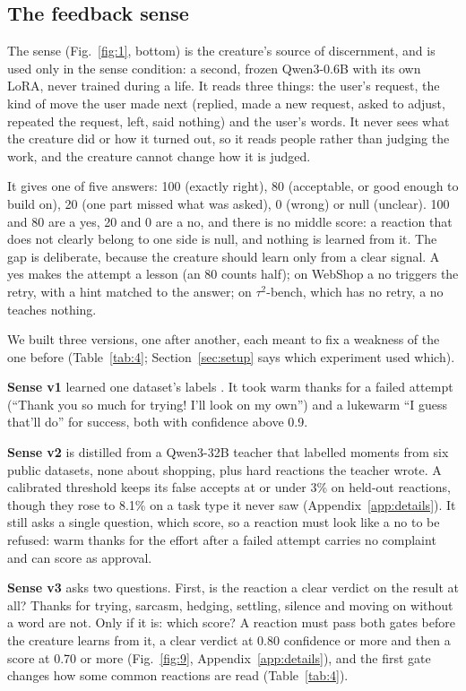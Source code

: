 \subsection{The feedback sense}\label{sec:sense}

The sense (Fig.~\ref{fig:1}, bottom) is the creature's source of discernment, and is used only in the sense condition: a second, frozen Qwen3-0.6B with its own LoRA, never trained during a life. It reads three things: the user's request, the kind of move the user made next (replied, made a new request, asked to adjust, repeated the request, left, said nothing) and the user's words. It never sees what the creature did or how it turned out, so it reads people rather than judging the work, and the creature cannot change how it is judged.

It gives one of five answers: 100 (exactly right), 80 (acceptable, or good enough to build on), 20 (one part missed what was asked), 0 (wrong) or null (unclear). 100 and 80 are a yes, 20 and 0 are a no, and there is no middle score: a reaction that does not clearly belong to one side is null, and nothing is learned from it. The gap is deliberate, because the creature should learn only from a clear signal. A yes makes the attempt a lesson (an 80 counts half); on WebShop a no triggers the retry, with a hint matched to the answer; on $\tau^2$-bench, which has no retry, a no teaches nothing.

We built three versions, one after another, each meant to fix a weakness of the one before (Table~\ref{tab:4}; Section~\ref{sec:setup} says which experiment used which).

\textbf{Sense v1} learned one dataset's labels \cite{peng2026wildreward}. It took warm thanks for a failed attempt (``Thank you so much for trying! I'll look on my own'') and a lukewarm ``I guess that'll do'' for success, both with confidence above 0.9.

\textbf{Sense v2} is distilled \cite{hinton2015distilling} from a Qwen3-32B teacher that labelled moments from six public datasets, none about shopping, plus hard reactions the teacher wrote. A calibrated threshold keeps its false accepts at or under 3\% on held-out reactions, though they rose to 8.1\% on a task type it never saw (Appendix~\ref{app:details}). It still asks a single question, which score, so a reaction must look like a no to be refused: warm thanks for the effort after a failed attempt carries no complaint and can score as approval.

\textbf{Sense v3} asks two questions. First, is the reaction a clear verdict on the result at all? Thanks for trying, sarcasm, hedging, settling, silence and moving on without a word are not. Only if it is: which score? A reaction must pass both gates before the creature learns from it, a clear verdict at 0.80 confidence or more and then a score at 0.70 or more (Fig.~\ref{fig:9}, Appendix~\ref{app:details}), and the first gate changes how some common reactions are read (Table~\ref{tab:4}).

